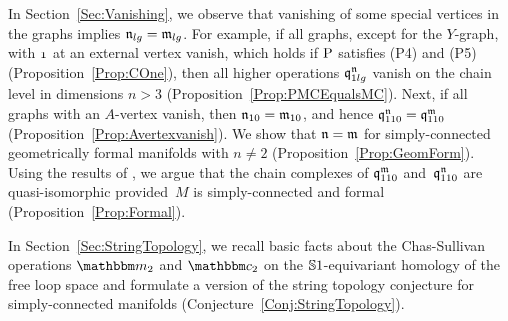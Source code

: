 \documentclass[\MainFolder/Text.tex]{subfiles}
\begin{document}
In Section~\ref{Sec:Vanishing}, we observe that vanishing of some special vertices in the graphs implies $\mathfrak{n}_{lg} = \mathfrak{m}_{lg}$. For example, if all graphs, except for the $Y$-graph, with $\NOne$ at an external vertex vanish, which holds if $\mathrm{P}$ satisfies (P4) and (P5) (Proposition~\ref{Prop:COne}), then all higher operations $\mathfrak{q}_{1lg}^{\mathfrak{n}}$ vanish on the chain level in dimensions $n>3$ (Proposition~\ref{Prop:PMCEqualsMC}). Next, if all graphs with an $A$-vertex vanish, then $\mathfrak{n}_{10}=\mathfrak{m}_{10}$, and hence $\mathfrak{q}_{110}^{\mathfrak{n}} = \mathfrak{q}_{110}^{\mathfrak{m}}$ (Proposition~\ref{Prop:Avertexvanish}). We show that $\mathfrak{n} = \mathfrak{m}$ for simply-connected geometrically formal manifolds with $n\neq 2$ (Proposition~\ref{Prop:GeomForm}). Using the results of \cite{Cieliebak2018}, we argue that the chain complexes of $\mathfrak{q}_{110}^{\mathfrak{m}}$ and~$\mathfrak{q}_{110}^{\mathfrak{n}}$ are quasi-isomorphic provided~$M$ is simply-connected and formal (Proposition~\ref{Prop:Formal}).


In Section~\ref{Sec:StringTopology}, we recall basic facts about the Chas-Sullivan operations $\StringOp_2$ and $\StringCoOp_2$ on the $\mathbb{S}{1}$-equivariant homology of the free loop space and formulate a version of the string topology conjecture for simply-connected manifolds (Conjecture~\ref{Conj:StringTopology}). 
 
\end{document}
